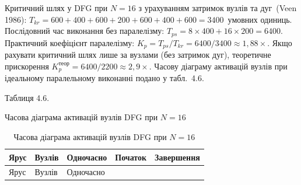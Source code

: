 Критичний шлях у DFG при \(N=16\) з урахуванням затримок вузлів та
дуг~(Veen 1986):
\(T_{kr}=600+400+600+200+600+400+600=3400\)~умовних одиниць. Послідовний
час виконання без паралелізму: \(T_{ps}=8\times400+16\times200=6400\).
Практичний коефіцієнт паралелізму:
\(K_p=T_{ps}/T_{kr}=6400/3400\approx1{,}88\times\). Якщо рахувати
критичний шлях лише за вузлами (без затримок дуг), теоретичне
прискорення \(K_p^{теор}=6400/2200\approx2{,}9\times\). Часову діаграму
активацій вузлів при ідеальному паралельному виконанні подано у
табл.~4.6.

Таблиця 4.6.

Часова діаграма активацій вузлів DFG при \(N=16\)

\begin{longtable}[]{@{}
  >{\raggedright\arraybackslash}p{}
  >{\raggedright\arraybackslash}p{}
  >{\raggedright\arraybackslash}p{}
  >{\raggedright\arraybackslash}p{}
  >{\raggedright\arraybackslash}p{}@{}}
\caption[Часова діаграма активацій вузлів DFG]{Часова діаграма активацій
вузлів DFG при \(N=16\)}\tabularnewline
\toprule\noalign{}
\begin{minipage}[b]{\linewidth}\raggedright
Ярус
\end{minipage} & \begin{minipage}[b]{\linewidth}\raggedright
Вузлів
\end{minipage} & \begin{minipage}[b]{\linewidth}\raggedright
Одночасно
\end{minipage} & \begin{minipage}[b]{\linewidth}\raggedright
Початок
\end{minipage} & \begin{minipage}[b]{\linewidth}\raggedright
Завершення
\end{minipage} \\
\midrule\noalign{}
\endfirsthead
\toprule\noalign{}
\begin{minipage}[b]{\linewidth}\raggedright
Ярус
\end{minipage} & \begin{minipage}[b]{\linewidth}\raggedright
Вузлів
\end{minipage} & \begin{minipage}[b]{\linewidth}\raggedright
Одночасно
\end{minipage} & \begin{minipage}[b]{\linewidth}\raggedright

\end{minipage}
\end{longtable}
